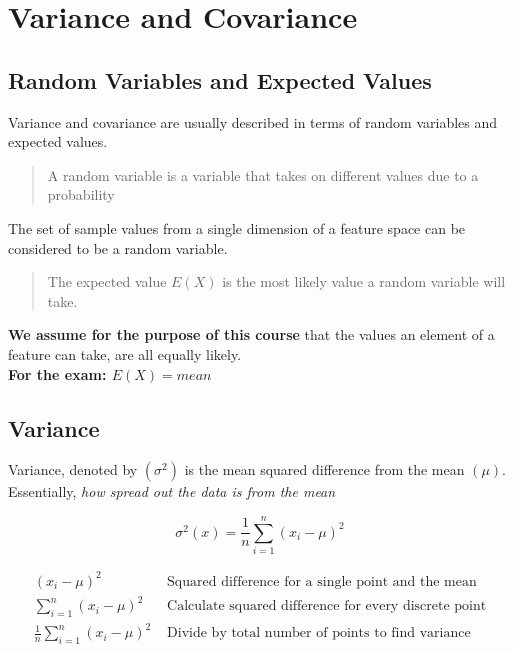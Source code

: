 \section{Variance and Covariance}

\subsection{Random Variables and Expected Values}

Variance and covariance are usually described in terms of random variables and expected values.

\begin{quote}
    A random variable is a variable that takes on different values due to a probability
\end{quote}

The set of sample values from a single dimension of a feature space can be considered to be a random variable.

\begin{quote}
    The expected value $E(X)$ is the most likely value a random variable will take.
\end{quote}

\textbf{We assume for the purpose of this course} that the values an element of a feature can take, are all equally likely. \\

\noindent \textbf{For the exam: $E(X)=mean$}

\subsection{Variance}
Variance, denoted by $(\sigma^{2})$ is the mean squared difference from the mean $(\mu)$. Essentially, \textit{how spread out the data is from the mean}

\begin{equation}
    \sigma^{2}(x) = \frac{1}{n}\sum_{i=1}^{n}(x_{i}-\mu)^{2}
\end{equation}

\begin{align}
    (x_{i}-\mu)^{2} &\text{ Squared difference for a single point and the mean} \\
    \sum_{i=1}^{n}(x_{i}-\mu)^{2} &\text{ Calculate squared difference for every discrete point} \\
    \frac{1}{n}\sum_{i=1}^{n}(x_{i}-\mu)^{2} &\text{ Divide by total number of points to find variance}
\end{align}

